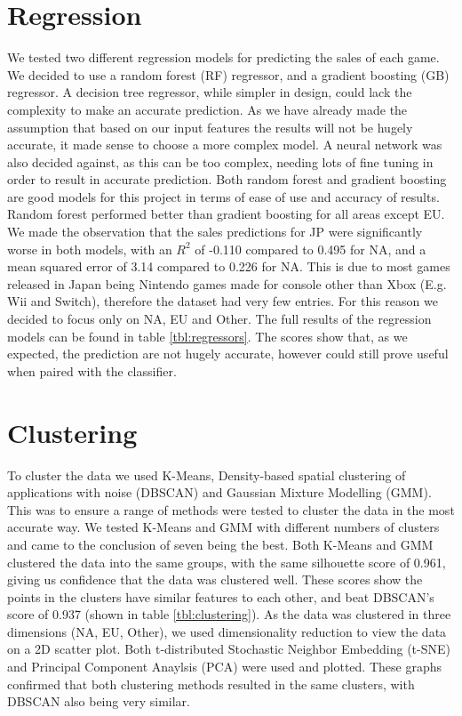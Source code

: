 \documentclass[english]{article}
\begin{document}
\section{Regression}
We tested two different regression models for predicting the sales of each game. We decided to use a random forest (RF) regressor, and a gradient boosting (GB) regressor. A decision tree regressor, while simpler in design, could lack the complexity to make an accurate prediction. As we have already made the assumption that based on our input features the results will not be hugely accurate, it made sense to choose a more complex model. A neural network was also decided against, as this can be too complex, needing lots of fine tuning in order to result in accurate prediction. Both random forest and gradient boosting are good models for this project in terms of ease of use and accuracy of results. Random forest performed better than gradient boosting for all areas except EU. We made the observation that the sales predictions for JP were significantly worse in both models, with an $R^2$ of -0.110 compared to 0.495 for NA, and a mean squared error of 3.14 compared to 0.226 for NA. This is due to most games released in Japan being Nintendo games made for console other than Xbox (E.g. Wii and Switch), therefore the dataset had very few entries. For this reason we decided to focus only on NA, EU and Other. The full results of the regression models can be found in table \ref{tbl:regressors}. The scores show that, as we expected, the prediction are not hugely accurate, however could still prove useful when paired with the classifier.

\section{Clustering}
To cluster the data we used K-Means, Density-based spatial clustering of applications with noise (DBSCAN) and Gaussian Mixture Modelling (GMM). This was to ensure a range of methods were tested to cluster the data in the most accurate way. We tested K-Means and GMM with different numbers of clusters and came to the conclusion of seven being the best. Both K-Means and GMM clustered the data into the same groups, with the same silhouette score of 0.961, giving us confidence that the data was clustered well. These scores show the points in the clusters have similar features to each other, and beat DBSCAN's score of 0.937 (shown in table \ref{tbl:clustering}). As the data was clustered in three dimensions (NA, EU, Other), we used dimensionality reduction to view the data on a 2D scatter plot. Both t-distributed Stochastic Neighbor Embedding (t-SNE) and Principal Component Anaylsis (PCA) were used and plotted. These graphs confirmed that both clustering methods resulted in the same clusters, with DBSCAN also being very similar.
\end{document}
